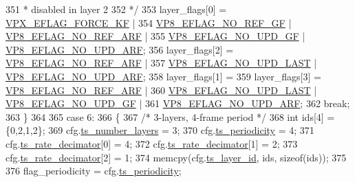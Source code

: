 \begin{DoxyCodeInclude}
{{{{{{{{{{{{{{{351 \textcolor{comment}{         * disabled in layer 2}
352 \textcolor{comment}{         */}
353         layer\_flags[0] = \hyperlink{group__encoder_ga4c4f4e3cbb5225d2c6c050e2d1e948fa}{VPX\_EFLAG\_FORCE\_KF}  |
354                          \hyperlink{group__vp8__encoder_gabb5e95343a2738abef44eca13059da33}{VP8\_EFLAG\_NO\_REF\_GF} | 
      \hyperlink{group__vp8__encoder_ga650ab0baea12be91082226a5cc18776a}{VP8\_EFLAG\_NO\_REF\_ARF} |
355                          \hyperlink{group__vp8__encoder_gab01d066c5236457d345ce1cab4c41d6b}{VP8\_EFLAG\_NO\_UPD\_GF} | 
      \hyperlink{group__vp8__encoder_ga1cff46a5287e73a620660030d40b9e6c}{VP8\_EFLAG\_NO\_UPD\_ARF};
356         layer\_flags[2] = \hyperlink{group__vp8__encoder_ga650ab0baea12be91082226a5cc18776a}{VP8\_EFLAG\_NO\_REF\_ARF} |
357                          \hyperlink{group__vp8__encoder_ga602edb6b02a89cb2db7a16d6dffba583}{VP8\_EFLAG\_NO\_UPD\_LAST} | 
      \hyperlink{group__vp8__encoder_ga1cff46a5287e73a620660030d40b9e6c}{VP8\_EFLAG\_NO\_UPD\_ARF};
358         layer\_flags[1] =
359         layer\_flags[3] = \hyperlink{group__vp8__encoder_ga650ab0baea12be91082226a5cc18776a}{VP8\_EFLAG\_NO\_REF\_ARF} |
360                          \hyperlink{group__vp8__encoder_ga602edb6b02a89cb2db7a16d6dffba583}{VP8\_EFLAG\_NO\_UPD\_LAST} | 
      \hyperlink{group__vp8__encoder_gab01d066c5236457d345ce1cab4c41d6b}{VP8\_EFLAG\_NO\_UPD\_GF} |
361                          \hyperlink{group__vp8__encoder_ga1cff46a5287e73a620660030d40b9e6c}{VP8\_EFLAG\_NO\_UPD\_ARF};
362         \textcolor{keywordflow}{break};
363     \}
364 
365     \textcolor{keywordflow}{case} 6:
366     \{
367         \textcolor{comment}{/* 3-layers, 4-frame period */}
368         \textcolor{keywordtype}{int} ids[4] = \{0,2,1,2\};
369         cfg.\hyperlink{structvpx__codec__enc__cfg_a16d4549a30cbd585e3c3056ef873d8c7}{ts\_number\_layers}     = 3;
370         cfg.\hyperlink{structvpx__codec__enc__cfg_a4ec338780115dd270acf0dac24193474}{ts\_periodicity}       = 4;
371         cfg.\hyperlink{structvpx__codec__enc__cfg_ad40c30846ef8ef1d8684f10a491ec535}{ts\_rate\_decimator}[0] = 4;
372         cfg.\hyperlink{structvpx__codec__enc__cfg_ad40c30846ef8ef1d8684f10a491ec535}{ts\_rate\_decimator}[1] = 2;
373         cfg.\hyperlink{structvpx__codec__enc__cfg_ad40c30846ef8ef1d8684f10a491ec535}{ts\_rate\_decimator}[2] = 1;
374         memcpy(cfg.\hyperlink{structvpx__codec__enc__cfg_a4d105d2470dbfb7210b33d298f1cf1f6}{ts\_layer\_id}, ids, \textcolor{keyword}{sizeof}(ids));
375 
376         flag\_periodicity = cfg.\hyperlink{structvpx__codec__enc__cfg_a4ec338780115dd270acf0dac24193474}{ts\_periodicity};
}}}}}}}}}}}}}}}
\end{DoxyCodeInclude}
